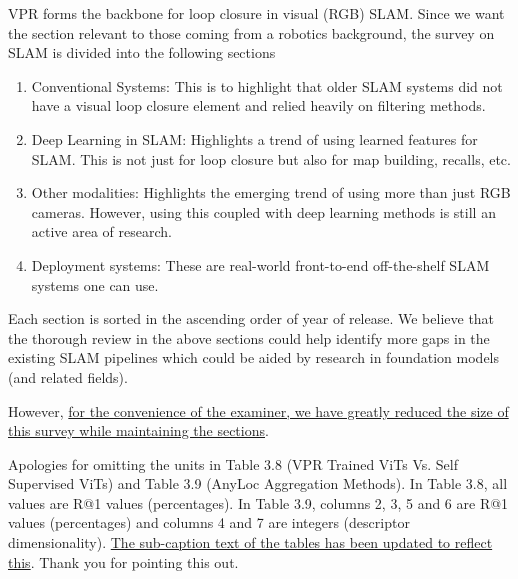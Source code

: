 VPR forms the backbone for loop closure in visual (RGB) SLAM. Since we
want the section relevant to those coming from a robotics background,
the survey on SLAM is divided into the following sections
\begin{enumerate}
    \item Conventional Systems: This is to highlight that older SLAM
        systems did not have a visual loop closure element and relied
        heavily on filtering methods.
    \item Deep Learning in SLAM: Highlights a trend of using learned
        features for SLAM. This is not just for loop closure but also
        for map building, recalls, etc.
    \item Other modalities: Highlights the emerging trend of using
        more than just RGB cameras. However, using this coupled with
        deep learning methods is still an active area of research.
    \item Deployment systems: These are real-world front-to-end
        off-the-shelf SLAM systems one can use.
\end{enumerate}

Each section is sorted in the ascending order of year of release. We
believe that the thorough review in the above sections could help
identify more gaps in the existing SLAM pipelines which could be aided
by research in foundation models (and related fields).

However, \ul{for the convenience of the examiner, we have greatly
reduced the size of this survey while maintaining the sections}.


Apologies for omitting the units in Table 3.8 (VPR Trained ViTs Vs.
Self Supervised ViTs) and Table 3.9 (AnyLoc Aggregation Methods). In
Table 3.8, all values are R@1 values (percentages). In Table 3.9,
columns 2, 3, 5 and 6 are R@1 values (percentages) and columns 4 and 7
are integers (descriptor dimensionality). \ul{The sub-caption text of
the tables has been updated to reflect this}. Thank you for pointing
this out.

